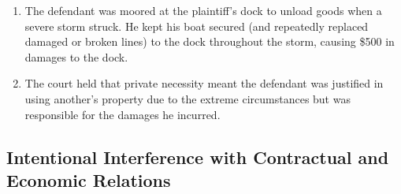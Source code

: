 \begin{enumerate}
    \item The defendant was moored at the plaintiff's dock to unload goods 
    when a severe storm struck.  He kept his boat secured (and repeatedly 
    replaced damaged or broken lines) to the dock throughout the storm, 
    causing \$500 in damages to the dock.
    \item The court held that private necessity meant the defendant was 
    justified in using another's property due to the extreme circumstances but 
    was responsible for the damages he incurred.
\end{enumerate}



\subsection{Intentional Interference with Contractual and Economic Relations}

